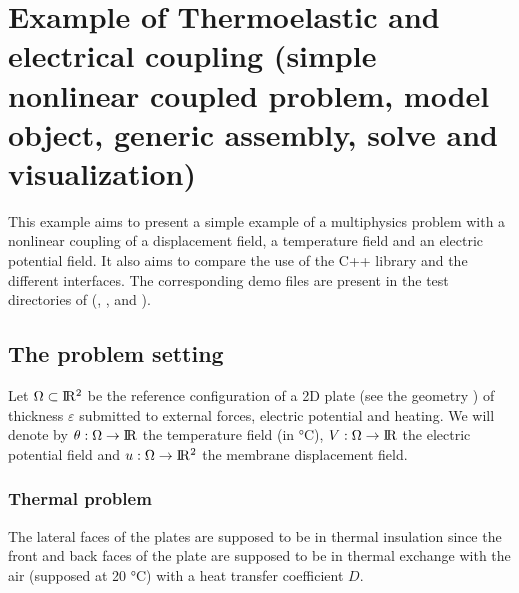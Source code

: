 \documentclass[a4paper,11pt,english]{sphinxmanual}
\begin{document}
\chapter{Example of Thermo\sphinxhyphen{}elastic and electrical coupling (simple nonlinear coupled problem, model object, generic assembly, solve and visualization)}
\label{\detokenize{tutorial/thermo_coupling:example-of-thermo-elastic-and-electrical-coupling-simple-nonlinear-coupled-problem-model-object-generic-assembly-solve-and-visualization}}\label{\detokenize{tutorial/thermo_coupling:tut-thermo-elec-coupling}}\label{\detokenize{tutorial/thermo_coupling::doc}}
\sphinxAtStartPar
This example aims to present a simple example of a multiphysics problem with a nonlinear coupling of a displacement field, a temperature field and an electric potential field. It also aims to compare the use of the C++ library and the different interfaces. The corresponding demo files are present in the test directories of  (, ,  and ).


\section{The problem setting}
\label{\detokenize{tutorial/thermo_coupling:the-problem-setting}}
\sphinxAtStartPar
Let \(\Omega \subset \rm I\hspace{-0.15em}R^2\) be the reference configuration of a 2D plate (see the geometry {\hyperref[\detokenize{tutorial/thermo_coupling:tut-fig-meshthermo}]{}}) of thickness \(\varepsilon\) submitted to external forces, electric potential and heating. We will denote by  \(\theta : \Omega \rightarrow \rm I\hspace{-0.15em}R\) the temperature field (in °C),  \(V : \Omega \rightarrow \rm I\hspace{-0.15em}R\) the electric potential field and \(u : \Omega \rightarrow \rm I\hspace{-0.15em}R^2\) the membrane displacement field.


\subsection{Thermal problem}
\label{\detokenize{tutorial/thermo_coupling:thermal-problem}}
\sphinxAtStartPar
The lateral faces of the plates are supposed to be in thermal insulation since the front and back faces of the plate are supposed to be in thermal exchange with the air (supposed at 20 °C) with a heat transfer coefficient \(D\).
\end{document}
